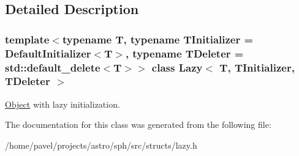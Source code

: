 \subsection{Detailed Description}
\subsubsection*{template$<$typename T, typename T\+Initializer = Default\+Initializer$<$\+T$>$, typename T\+Deleter = std\+::default\+\_\+delete$<$\+T$>$$>$\newline
class Lazy$<$ T, T\+Initializer, T\+Deleter $>$}

\hyperlink{classObject}{Object} with lazy initialization. 

The documentation for this class was generated from the following file\+:\begin{DoxyCompactItemize}
\item 
/home/pavel/projects/astro/sph/src/structs/lazy.\+h\end{DoxyCompactItemize}
